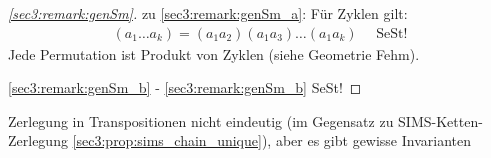 \begin{proof}[\cref{sec3:remark:genSm}]
	\item zu \cref{sec3:remark:genSm_a}: Für Zyklen gilt:
	\begin{align*}
		(a_1 \dots a_k) = (a_1 a_2)(a_1 a_3)\dots (a_1 a_k) \quad \text{ SeSt!}		
	\end{align*}
	Jede Permutation ist Produkt von Zyklen (siehe Geometrie Fehm).
	\item \cref{sec3:remark:genSm_b} - \cref{sec3:remark:genSm_b} SeSt!
\end{proof}
\begin{*remark}
	Zerlegung in Transpositionen nicht eindeutig (im Gegensatz zu SIMS-Ketten-Zerlegung \cref{sec3:prop:sims_chain_unique}), aber es gibt gewisse Invarianten
\end{*remark}
